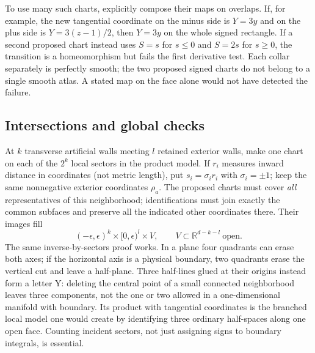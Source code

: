To use many such charts, explicitly compose their maps on overlaps. If, for example, the new tangential coordinate on the minus side is $Y=3y$ and on the plus side is $Y=3(z-1)/2$, then $Y=3y$ on the whole signed rectangle. If a second proposed chart instead uses $S=s$ for $s\leq0$ and $S=2s$ for $s\geq0$, the transition is a homeomorphism but fails the first derivative test. Each collar separately is perfectly smooth; the two proposed signed charts do not belong to a single smooth atlas. A stated map on the face alone would not have detected the failure.

\subsection{Intersections and global checks}
At $k$ transverse artificial walls meeting $l$ retained exterior walls, make one chart on each of the $2^k$ local sectors in the product model. If $r_i$ measures inward distance in coordinates (not metric length), put $s_i=\sigma_i r_i$ with $\sigma_i=\pm1$; keep the same nonnegative exterior coordinates $\rho_a$. The proposed charts must cover \emph{all} representatives of this neighborhood; identifications must join exactly the common subfaces and preserve all the indicated other coordinates there. Their images fill
\[
 (-\epsilon,\epsilon)^k\times[0,\epsilon)^l\times V,
 \qquad V\subset\mathbb R^{d-k-l}\ \text{open}.
\]
The same inverse-by-sectors proof works. In a plane four quadrants can erase both axes; if the horizontal axis is a physical boundary, two quadrants erase the vertical cut and leave a half-plane. Three half-lines glued at their origins instead form a letter Y: deleting the central point of a small connected neighborhood leaves three components, not the one or two allowed in a one-dimensional manifold with boundary. Its product with tangential coordinates is the branched local model one would create by identifying three ordinary half-spaces along one open face. Counting incident sectors, not just assigning signs to boundary integrals, is essential.

